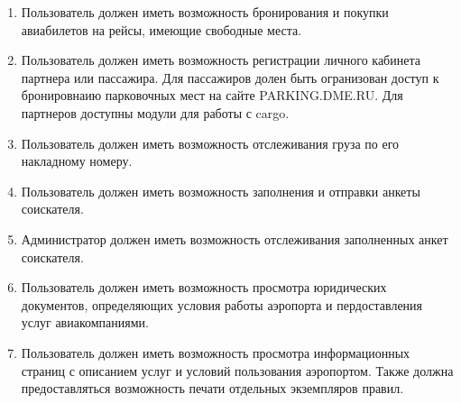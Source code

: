 \begin{enumerate}
    \item Пользователь должен иметь возможность бронирования
          и покупки авиабилетов на рейсы, имеющие
          свободные места.

    \item Пользователь должен иметь возможность
          регистрации личного кабинета партнера или
          пассажира. Для пассажиров долен быть
          огранизован доступ к бронировнаию парковочных
          мест на сайте PARKING.DME.RU. Для партнеров
          доступны модули для работы с cargo.

    \item Пользователь должен иметь возможность
          отслеживания груза по его накладному номеру.

    \item Пользователь должен иметь возможность
          заполнения и отправки анкеты соискателя.

    \item Администратор должен иметь возможность
          отслеживания заполненных анкет соискателя.

    \item Пользователь должен иметь возможность
          просмотра юридических документов, определяющих
          условия работы аэропорта и пердоставления
          услуг авиакомпаниями.

    \item Пользователь должен иметь возможность просмотра
          информационных страниц с описанием услуг и
          условий пользования аэропортом. Также должна
          предоставляться возможность печати отдельных
          экземпляров правил.
\end{enumerate}
